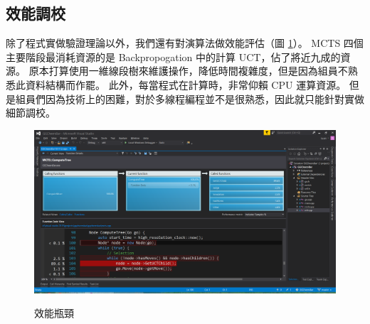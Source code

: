 \documentclass[12pt]{article}
\begin{document}
\begin{CJK}{UTF8}{bsmi}
\section{效能調校}
除了程式實做驗證理論以外，我們還有對演算法做效能評估（圖 \ref{performance}）。
MCTS 四個主要階段最消耗資源的是 Backpropogation 中的計算 UCT，佔了將近九成的資源。
原本打算使用一維線段樹來維護操作，降低時間複雜度，但是因為組員不熟悉此資料結構而作罷。
此外，每當程式在計算時，非常仰賴 CPU 運算資源。
但是組員們因為技術上的困難，對於多線程編程並不是很熟悉，因此就只能針對實做細節調校。

\begin{figure}
  \caption{效能瓶頸}
  \centering
  \includegraphics[width=1.2\textwidth]{performance}
  \label{performance}
\end{figure}



\end{CJK}
\end{document}
